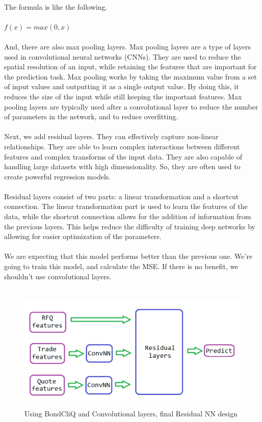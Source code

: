 \documentclass{article}
\begin{document}
\\
The formula is like the following.\\
\\
$f(x) = max(0, x)$\\
\\
And, there are also max pooling layers. Max pooling layers are a type of layers used in convolutional neural networks (CNNs). They are used to reduce the spatial resolution of an input, while retaining the features that are important for the prediction task. Max pooling works by taking the maximum value from a set of input values and outputting it as a single output value. By doing this, it reduces the size of the input while still keeping the important features. Max pooling layers are typically used after a convolutional layer to reduce the number of parameters in the network, and to reduce overfitting.\\
\\
Next, we add residual layers. They can effectively capture non-linear relationships. They are able to learn complex interactions between different features and complex transforms of the input data. They are also capable of handling large datasets with high dimensionality. So, they are often used to create powerful regression models.\\
\\
Residual layers consist of two parts: a linear transformation and a shortcut connection. The linear transformation part is used to learn the features of the data, while the shortcut connection allows for the addition of information from the previous layers. This helps reduce the difficulty of training deep networks by allowing for easier optimization of the parameters.\\
\\
We are expecting that this model performs better than the previous one. We're going to train this model, and calculate the MSE. If there is no benefit, we shouldn't use convolutional layers.\\
\\

\begin{figure}
    \centering
    \includegraphics[scale=0.5]{NN-architecture-3.png}
    \caption{Using BondCliQ and Convolutional layers, final Residual NN design}
    \label{fig:my_label}
\end{figure}
\end{document}
